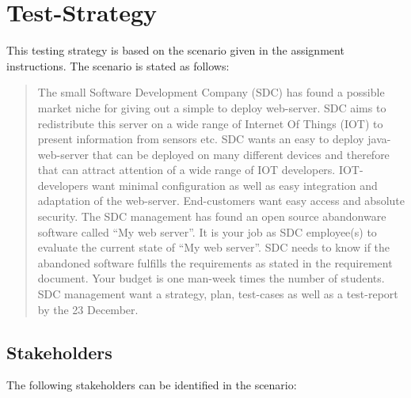 %
%
%


\section{Test-Strategy}
%
%
%

This testing strategy is based on the scenario given in the assignment instructions.
The scenario \cite{2dv610:assignment2-instructions} is stated as follows:

\begin{quote}
  The small Software Development Company (SDC) has found a possible market niche
  for giving out a simple to deploy web-server. SDC aims to redistribute this
  server on a wide range of Internet Of Things (IOT) to present information
  from sensors etc. SDC wants an easy to deploy java-web-server that can be
  deployed on many different devices and therefore that can attract attention
  of a wide range of IOT developers. IOT-developers want minimal
  configuration as well as easy integration and adaptation of the web-server.
  End-customers want easy access and absolute security. The SDC management
  has found an open source abandonware software called “My web server”. It is
  your job as SDC employee(s) to evaluate the current state of “My web
  server”. SDC needs to know if the abandoned software fulfills the
  requirements as stated in the requirement document. Your budget is one
  man-week times the number of students. SDC management want a strategy,
  plan, test-cases as well as a test-report by the 23 December.
\end{quote}

\subsection{Stakeholders}
The following stakeholders can be identified in the scenario:

